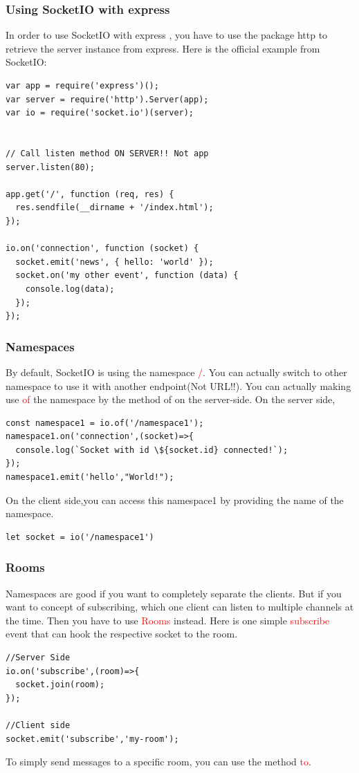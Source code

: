 \documentclass[a4paper]{article}
\begin{document}
\subsubsection{Using SocketIO with express}
In order to use SocketIO with express , you have to use the package http to retrieve the server instance from express. Here is the official example from SocketIO:
\begin{lstlisting}
var app = require('express')();
var server = require('http').Server(app);
var io = require('socket.io')(server);


// Call listen method ON SERVER!! Not app
server.listen(80);

app.get('/', function (req, res) {
  res.sendfile(__dirname + '/index.html');
});

io.on('connection', function (socket) {
  socket.emit('news', { hello: 'world' });
  socket.on('my other event', function (data) {
    console.log(data);
  });
});
\end{lstlisting}

\subsubsection{Namespaces}
By default, SocketIO is using the namespace \textcolor{red}{/}. You can actually switch to other namespace to use it with another endpoint(Not URL!!). You can actually making use \textcolor{red}{of} the namespace by the method of on the server-side. On the server side,
\begin{lstlisting}
const namespace1 = io.of('/namespace1');  
namespace1.on('connection',(socket)=>{
  console.log(`Socket with id \${socket.id} connected!`);
});
namespace1.emit('hello',"World!");
\end{lstlisting}
On the client side,you can access this namespace1 by providing the name of the namespace.
\begin{lstlisting}
let socket = io('/namespace1')
\end{lstlisting}
\subsubsection{Rooms}
Namespaces are good if you want to completely separate the clients. But if you want to concept of subscribing, which one client can listen to multiple channels at the time. Then you have to use \textcolor{red}{Rooms} instead. Here is one simple \textcolor{red}{subscribe} event that can hook the respective socket to the room.
\begin{lstlisting}
//Server Side
io.on('subscribe',(room)=>{
  socket.join(room);
});

//Client side
socket.emit('subscribe','my-room');
\end{lstlisting}
To simply send messages to a specific room, you can use the method \textcolor{red}{to}.
\end{document}
